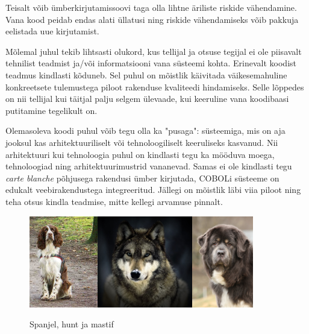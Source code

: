 \documentclass{article}
\begin{document}
Teisalt võib ümberkirjutamissoovi taga olla lihtne äriliste riskide vähendamine. Vana kood peidab endas alati üllatusi ning riskide vähendamiseks võib pakkuja eelistada uue kirjutamist. 

Mõlemal juhul tekib lihtsasti olukord, kus tellijal ja otsuse tegijal ei ole piisavalt tehnilist teadmist ja/või informatsiooni vana süsteemi kohta. Erinevalt koodist teadmus kindlasti kõduneb. Sel puhul on mõistlik käivitada väikesemahuline konkreetsete tulemustega piloot rakenduse kvaliteedi hindamiseks. Selle lõppedes on nii tellijal kui täitjal palju selgem ülevaade, kui keeruline vana koodibaasi putitamine tegelikult on.

Olemasoleva koodi puhul võib tegu olla ka "pusaga": süsteemiga, mis on aja jooksul kas arhitektuuriliselt või tehnoloogiliselt keeruliseks kasvanud. Nii arhitektuuri kui tehnoloogia puhul on kindlasti tegu ka mööduva moega, tehno\-loogiad ning arhitektuurimustrid vananevad. Samas ei ole kindlasti tegu \textit{carte blanche} põhjusega rakendusi ümber kirjutada, COBOLi süsteeme on edukalt veebirakendustega integreeritud. Jällegi on mõistlik läbi viia piloot ning teha otsus kindla teadmise, mitte kellegi arvamuse pinnalt.

\begin{figure}[htp]
	\begin{center}
		\includegraphics[height=4cm]{spaniel.jpg}\includegraphics[height=4cm]{wolf.jpg}\includegraphics[height=4cm]{mastiff.jpg}
		\caption{Spanjel, hunt ja mastif}
	\end{center}
\end{figure}
\end{document}

